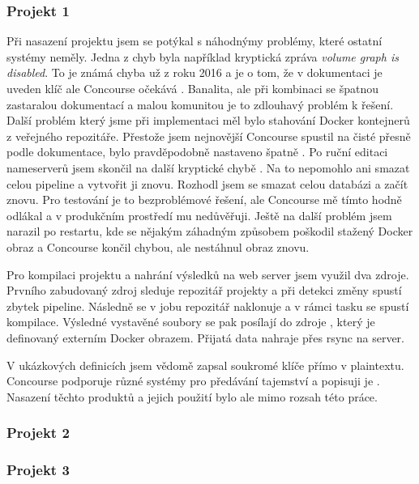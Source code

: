 
        \subsubsection{Projekt 1}
            Při nasazení projektu jsem se potýkal s náhodnýmy problémy, které ostatní \CI systémy neměly. Jedna z chyb byla například kryptická zpráva \textit{volume graph is disabled}. To je známá chyba už z roku 2016 a je o tom, že v dokumentaci je uveden klíč  ale Concourse očekává  \cite{concourse-issue-402}. Banalita, ale při kombinaci se špatnou zastaralou dokumentací a malou komunitou je to zdlouhavý problém k řešení. Další problém který jsme při implementaci měl bylo stahování Docker kontejnerů z veřejného repozitáře. Přestože jsem nejnovější Concourse spustil na čisté  přesně podle dokumentace, bylo pravděpodobně nastaveno špatně . Po ruční editaci nameserverů jsem skončil na další kryptické chybě . Na to nepomohlo ani smazat celou pipeline a vytvořit ji znovu. Rozhodl jsem se smazat celou databázi a začít znovu. Pro testování je to bezproblémové řešení, ale Concourse mě tímto hodně odlákal a v produkčním prostředí mu nedůvěřuji. Ještě na další problém jsem narazil po restartu, kde se nějakým záhadným způsobem poškodil stažený Docker obraz a Concourse končil chybou, ale nestáhnul obraz znovu.

            Pro kompilaci projektu a nahrání výsledků na web server jsem využil dva zdroje. Prvního zabudovaný zdroj  sleduje repozitář projekty a při detekci změny spustí zbytek pipeline. Následně se v jobu repozitář naklonuje a v rámci tasku se spustí kompilace. Výsledné vystavěné soubory se pak posílají do zdroje , který je definovaný externím Docker obrazem. Přijatá data nahraje přes rsync na server.

            V ukázkových definicích jsem vědomě zapsal soukromé klíče přímo v plaintextu. Concourse podporuje různé systémy pro předávání tajemství a popisuji je . Nasazení těchto produktů a jejich použití bylo ale mimo rozsah této práce.

        \subsubsection{Projekt 2}
            \blind[2]

        \subsubsection{Projekt 3}
            \blind[2]
